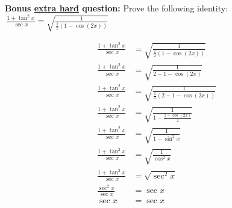 \documentclass[addpoints]{exam}
\begin{document}
\begin{questions}
    \question \textbf{Bonus \underline{extra hard} question:} Prove the following identity: $\displaystyle\, \frac{1 + \tan^2 x}{\sec x} = \sqrt{\frac{1}{\frac{1}{2}\left(1 - \cos(2x)\right)}}$ 
    \begin{solution}[\stretch{1}]
      \begin{align*}
        \frac{1 + \tan^2 x}{\sec x} &= \sqrt{\frac{1}{\frac{1}{2}\left(1 - \cos(2x)\right)}} \\ 
        \frac{1 + \tan^2 x}{\sec x} &= \sqrt{\frac{1}{2 - 1 - \cos(2x)}} \\ 
        \frac{1 + \tan^2 x}{\sec x} &= \sqrt{\frac{1}{\frac{1}{2}\left(2 - 1 - \cos(2x)\right)}} \\ 
        \frac{1 + \tan^2 x}{\sec x} &= \sqrt{\frac{1}{1 - \frac{1 - \cos(2x)}{2}}} \\ 
        \frac{1 + \tan^2 x}{\sec x} &= \sqrt{\frac{1}{1 - \sin^2 x}} \\ 
        \frac{1 + \tan^2 x}{\sec x} &= \sqrt{\frac{1}{\cos^2 x}} \\ 
        \frac{1 + \tan^2 x}{\sec x} &= \sqrt{\sec^2 x} \\ 
        \frac{\sec^2 x}{\sec x} &= \sec x \\ 
        \sec x &= \sec x
      \end{align*}
    \end{solution}
  \end{questions}
\end{document}
